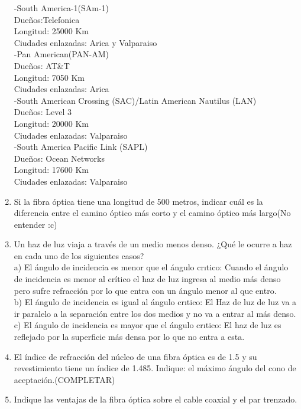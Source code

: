 \documentclass{udparticle}
\begin{document}
\begin{enumerate}
-South America-1(SAm-1)\\
Dueños:Telefonica\\
Longitud: 25000 Km\\
Ciudades enlazadas: Arica y Valparaiso\\
-Pan American(PAN-AM)\\
Dueños: AT&T\\
Longitud: 7050 Km\\
Ciudades enlazadas: Arica\\
-South American Crossing (SAC)/Latin American Nautilus (LAN)\\
Dueños: Level 3\\
Longitud: 20000 Km\\
Ciudades enlazadas: Valparaiso\\
-South America Pacific Link (SAPL)\\
Dueños: Ocean Networks\\
Longitud: 17600 Km\\
Ciudades enlazadas: Valparaiso\\ 
\item Si la fibra óptica tiene una longitud de 500 metros, indicar cuál es la diferencia entre el camino 
óptico más corto y el camino  óptico más largo(No entender :c)\\
\item  Un haz de luz viaja a través de un medio menos denso. ¿Qué le ocurre a haz en cada uno de los siguientes casos? \\
a) El ángulo de incidencia es menor que el ángulo crıtico: Cuando el ángulo de incidencia es menor al crítico el haz de luz ingresa al medio más denso pero sufre refracción por lo que entra con un ángulo menor al que entro.\\
b) El ángulo de incidencia es igual al ángulo crıtico: El Haz de luz de luz va a ir paralelo a la separación entre los dos medios y no va a entrar al más denso.\\
c) El ángulo de incidencia es mayor que el ángulo crıtico: El haz de luz es reflejado por la superficie más densa por lo que no entra a esta.\\
\item  El índice de refracción del núcleo de una fibra óptica es de 1.5 y su revestimiento tiene un índice de 1.485. Indique: el máximo ángulo del cono de aceptación.(COMPLETAR)\\
\item  Indique las ventajas de la fibra óptica sobre el cable coaxial y el par trenzado.\\

\end{enumerate}
\end{document}
